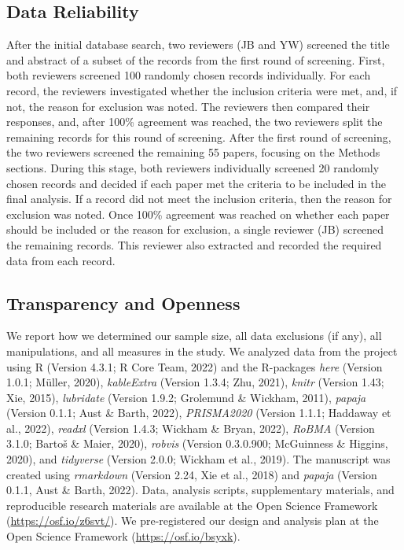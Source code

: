 \documentclass[
  ,pub,floatsintext]{apa6}
\begin{document}
\normalsize

\hypertarget{data-reliability}{%
\subsection{Data Reliability}\label{data-reliability}}

After the initial database search, two reviewers (JB and YW) screened the title and abstract of a subset of the records from the first round of screening. First, both reviewers screened 100 randomly chosen records individually. For each record, the reviewers investigated whether the inclusion criteria were met, and, if not, the reason for exclusion was noted. The reviewers then compared their responses, and, after 100\% agreement was reached, the two reviewers split the remaining records for this round of screening. After the first round of screening, the two reviewers screened the remaining 55 papers, focusing on the Methods sections. During this stage, both reviewers individually screened 20 randomly chosen records and decided if each paper met the criteria to be included in the final analysis. If a record did not meet the inclusion criteria, then the reason for exclusion was noted. Once 100\% agreement was reached on whether each paper should be included or the reason for exclusion, a single reviewer (JB) screened the remaining records. This reviewer also extracted and recorded the required data from each record.

\hypertarget{transparency-and-openness}{%
\subsection{Transparency and Openness}\label{transparency-and-openness}}

We report how we determined our sample size, all data exclusions (if any), all manipulations, and all measures in the study. We analyzed data from the project using R (Version 4.3.1; R Core Team, 2022) and the R-packages \emph{here} (Version 1.0.1; Müller, 2020), \emph{kableExtra} (Version 1.3.4; Zhu, 2021), \emph{knitr} (Version 1.43; Xie, 2015), \emph{lubridate} (Version 1.9.2; Grolemund \& Wickham, 2011), \emph{papaja} (Version 0.1.1; Aust \& Barth, 2022), \emph{PRISMA2020} (Version 1.1.1; Haddaway et al., 2022), \emph{readxl} (Version 1.4.3; Wickham \& Bryan, 2022), \emph{RoBMA} (Version 3.1.0; Bartoš \& Maier, 2020), \emph{robvis} (Version 0.3.0.900; McGuinness \& Higgins, 2020), and \emph{tidyverse} (Version 2.0.0; Wickham et al., 2019). The manuscript was created using \emph{rmarkdown} (Version 2.24, Xie et al., 2018) and \emph{papaja} (Version 0.1.1, Aust \& Barth, 2022). Data, analysis scripts, supplementary materials, and reproducible research materials are available at the Open Science Framework (\url{https://osf.io/z6svt/}). We pre-registered our design and analysis plan at the Open Science Framework (\url{https://osf.io/bsyxk}).
\end{document}
